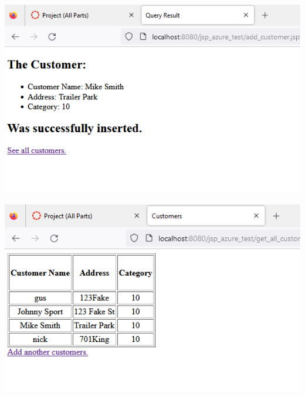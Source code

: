 \documentclass[11pt]{article}
\begin{document}
\includegraphics[width = \textwidth]{web4.png}

\includegraphics[width = \textwidth]{web5.png}
\end{document}

